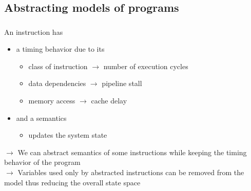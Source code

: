 \documentclass{beamer}
\begin{document}
  \subsection{Abstracting models of programs}
  \begin{frame}
    \frametitle{\secname}
    \framesubtitle{\subsecname}

    An instruction has
    \begin{itemize}
    \item a timing behavior due to its
      \begin{itemize}
        \item class of instruction $\rightarrow$ number of execution cycles
        \item data dependencies $\rightarrow$ pipeline stall
        \item memory access $\rightarrow$ cache delay
      \end{itemize}
      \item and a semantics
        \begin{itemize}
          \item updates the system state
        \end{itemize}
    \end{itemize}

    \begin{center}
      $\rightarrow$ We can abstract semantics of some instructions while keeping the timing behavior of the program \\
      \vspace{1em}
      $\rightarrow$ Variables used only by abstracted instructions can be removed from the model
      thus reducing the overall state space
    \end{center}

  \end{frame}
\end{document}
